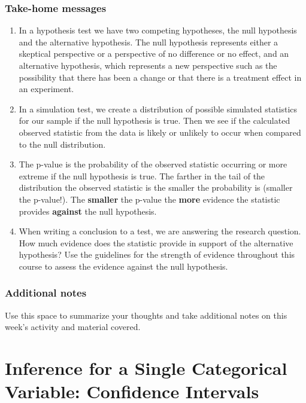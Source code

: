 \documentclass[
]{report}
\begin{document}
\vspace{0.5in}

\hypertarget{take-home-messages-5}{%
\subsection{Take-home messages}\label{take-home-messages-5}}

\begin{enumerate}
\def\labelenumi{\arabic{enumi}.}
\item
  In a hypothesis test we have two competing hypotheses, the null hypothesis and the alternative hypothesis. The null hypothesis represents either a skeptical perspective or a perspective of no difference or no effect, and an alternative hypothesis, which represents a new perspective such as the possibility that there has been a change or that there is a treatment effect in an experiment.
\item
  In a simulation test, we create a distribution of possible simulated statistics for our sample if the null hypothesis is true. Then we see if the calculated observed statistic from the data is likely or unlikely to occur when compared to the null distribution.
\item
  The p-value is the probability of the observed statistic occurring or more extreme if the null hypothesis is true. The farther in the tail of the distribution the observed statistic is the smaller the probability is (smaller the p-value!). The \textbf{smaller} the p-value the \textbf{more} evidence the statistic provides \textbf{against} the null hypothesis.
\item
  When writing a conclusion to a test, we are answering the research question. How much evidence does the statistic provide in support of the alternative hypothesis? Use the guidelines for the strength of evidence throughout this course to assess the evidence against the null hypothesis.
\end{enumerate}

\hypertarget{additional-notes-5}{%
\subsection{Additional notes}\label{additional-notes-5}}

Use this space to summarize your thoughts and take additional notes on this week's activity and material covered.

\hypertarget{inference-for-a-single-categorical-variable-confidence-intervals}{%
\chapter{Inference for a Single Categorical Variable: Confidence Intervals}\label{inference-for-a-single-categorical-variable-confidence-intervals}}
\end{document}
